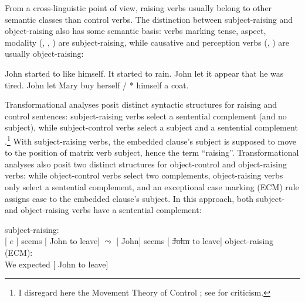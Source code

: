 From a cross-linguistic point of view, raising verbs usually belong to other semantic classes than
control verbs. The distinction between subject-raising and object-raising also has some semantic
basis: verbs marking tense, aspect, modality (, , ) are
subject-raising, while causative and perception verbs (, ) are usually
object-raising:

\eal
\ex John started to like himself.
\ex It started to rain.
\ex John let it appear that he was tired.
\ex John let Mary buy herself / * himself a coat.
\zl
	

Transformational analyses posit distinct syntactic structures for raising and control sentences:
subject-raising verbs select a sentential complement (and no subject), while subject-control verbs
select a subject and a sentential complement \parencites[33--39]{Postal1974}[55--64]{Chomsky81a}.\footnote{I disregard here the Movement Theory of Control \citep{Hornstein99a-u}; see  for criticism.}
With subject-raising
verbs, the embedded clause's subject is supposed to move to the position of matrix verb subject,
hence the  term ``raising''. Transformational analyses also posit two distinct structures for object-control and
object-raising verbs: while object-control verbs select two complements, object-raising verbs only
select a sentential complement, and an exceptional case marking (ECM) rule assigns case to the
embedded clause's subject.
In this approach, both subject- and object-raising verbs have a sentential complement:
	
\eal
\ex subject-raising:\\
{}[ $e$ ] seems [ John to leave] 
$\leadsto$  
{}[ John] seems [ \st{John} to leave]
\ex object-raising (ECM):\\
We expected [ John to leave] 	
\zl

